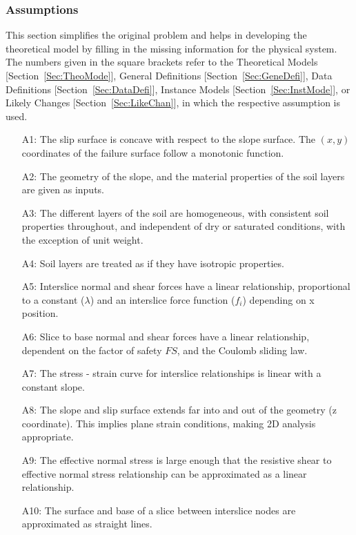 \documentclass[12pt]{article}
\begin{document}
\subsubsection{Assumptions}
\label{Sec:Assu}
This section simplifies the original problem and helps in developing the theoretical model by filling in the missing information for the physical system. The numbers given in the square brackets refer to the Theoretical Models [Section~\ref{Sec:TheoMode}], General Definitions [Section~\ref{Sec:GeneDefi}], Data Definitions [Section~\ref{Sec:DataDefi}], Instance Models [Section~\ref{Sec:InstMode}], or Likely Changes [Section~\ref{Sec:LikeChan}], in which the respective assumption is used.
\begin{itemize}
\item[A1:]The slip surface is concave with respect to the slope surface. The $(x,y)$ coordinates of the failure surface follow a monotonic function.
\item[A2:]The geometry of the slope, and the material properties of the soil layers are given as inputs.
\item[A3:]The different layers of the soil are homogeneous, with consistent soil properties throughout, and independent of dry or saturated conditions, with the exception of unit weight.
\item[A4:]Soil layers are treated as if they have isotropic properties.
\item[A5:]Interslice normal and shear forces have a linear relationship, proportional to a constant ($\lambda{}$) and an interslice force function ($f_{i}$) depending on x position.
\item[A6:]Slice to base normal and shear forces have a linear relationship, dependent on the factor of safety $FS$, and the Coulomb sliding law.
\item[A7:]The stress - strain curve for interslice relationships is linear with a constant slope.
\item[A8:]The slope and slip surface extends far into and out of the geometry (z coordinate). This implies plane strain conditions, making 2D analysis appropriate.
\item[A9:]The effective normal stress is large enough that the resistive shear to effective normal stress relationship can be approximated as a linear relationship.
\item[A10:]The surface and base of a slice between interslice nodes are approximated as straight lines.
\end{itemize}
\end{document}
